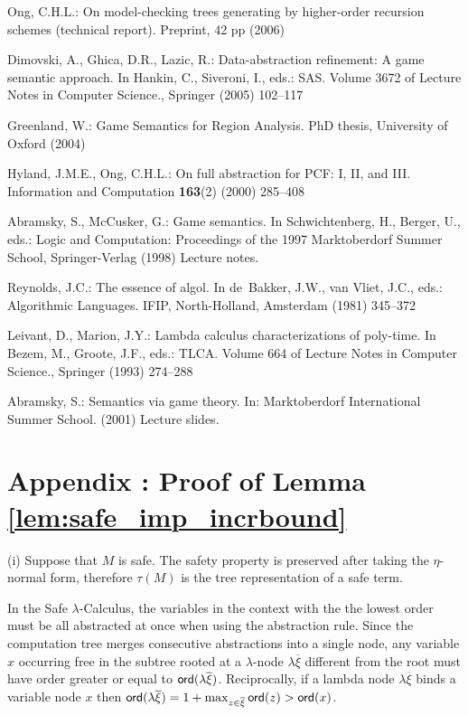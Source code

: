 \documentclass{llncs}
\newcommand\ord[1]{{\sf ord}(#1)}
\begin{document}
\begin{thebibliography}{10}
Ong, C.H.L.:
\newblock On model-checking trees generating by higher-order recursion schemes
  (technical report).
\newblock Preprint, 42 pp (2006)

Dimovski, A., Ghica, D.R., Lazic, R.:
\newblock Data-abstraction refinement: A game semantic approach.
\newblock In Hankin, C., Siveroni, I., eds.: SAS. Volume 3672 of Lecture Notes
  in Computer Science., Springer (2005)  102--117

Greenland, W.:
\newblock Game Semantics for Region Analysis.
\newblock PhD thesis, University of Oxford (2004)

Hyland, J.M.E., Ong, C.H.L.:
\newblock On full abstraction for {PCF}: {I, II, and III}.
\newblock Information and Computation \textbf{163}(2) (2000)  285--408

Abramsky, S., McCusker, G.:
\newblock Game semantics.
\newblock In Schwichtenberg, H., Berger, U., eds.: Logic and Computation:
  Proceedings of the 1997 Marktoberdorf Summer School, Springer-Verlag (1998)
  Lecture notes.

Reynolds, J.C.:
\newblock The essence of algol.
\newblock In de~Bakker, J.W., van Vliet, J.C., eds.: Algorithmic Languages.
\newblock IFIP, North-Holland, Amsterdam (1981)  345--372

Leivant, D., Marion, J.Y.:
\newblock Lambda calculus characterizations of poly-time.
\newblock In Bezem, M., Groote, J.F., eds.: TLCA. Volume 664 of Lecture Notes
  in Computer Science., Springer (1993)  274--288

Abramsky, S.:
\newblock Semantics via game theory.
\newblock In: Marktoberdorf International Summer School. (2001) Lecture slides.

\end{thebibliography}


\section*{Appendix : Proof of Lemma \ref{lem:safe_imp_incrbound}}
(i) Suppose that $M$ is safe. The safety property is preserved after
taking the $\eta$-normal form, therefore $\tau(M)$ is the tree representation of a safe term.

In the Safe $\lambda$-Calculus, the variables in the context with the the lowest order must be all abstracted
at once when using the abstraction rule. Since the computation
tree merges consecutive abstractions into a single node,
any variable $x$ occurring free in the subtree rooted at a $\lambda$-node $\lambda \overline{\xi}$ different from the root
must have order greater or equal to $\ord{\lambda \overline{\xi}}$. Reciprocally, if a lambda node
$\lambda \overline{\xi}$ binds a variable node $x$ then
$\ord{\lambda \overline{\xi}} = 1+\max_{z\in\overline{\xi}} \ord{z} > \ord{x}$.
\end{document}
